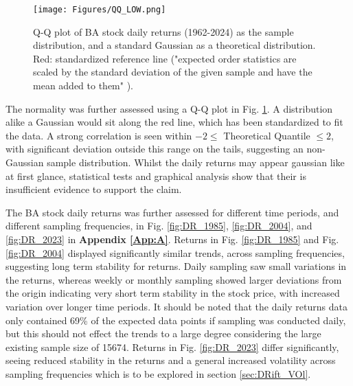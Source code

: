 \documentclass[
	a4paper, %
	11pt, %
	twoside, %
]{LTJournalArticle}
\begin{document}
\begin{figure}[ht]
	\texttt{[image: Figures/QQ\_LOW.png]}
	\caption{Q-Q plot of BA stock daily returns (1962-2024) as the sample distribution, and a standard Gaussian as a theoretical distribution. Red: standardized reference line ("expected order statistics are scaled by the standard deviation of the given sample and have the mean added to them" \cite{statsmodels_py}).}
	\label{fig:QQ}
\end{figure}

The normality was further assessed using a Q-Q plot in Fig. \ref{fig:QQ}.
A distribution alike a Gaussian would sit along the red line, which has been standardized to fit the data.
A strong correlation is seen within $-2\leq$ Theoretical Quantile $\leq 2$, with significant deviation outside this range on the tails, suggesting an non-Gaussian sample distribution.
Whilst the daily returns may appear gaussian like at first glance, statistical tests and graphical analysis show that their is insufficient evidence to support the claim.

\indent The BA stock daily returns was further assessed for different time periods, and different sampling frequencies, in Fig. \ref{fig:DR_1985}, \ref{fig:DR_2004}, and \ref{fig:DR_2023} in \textbf{Appendix \ref*{App:A}}.
Returns in Fig. \ref{fig:DR_1985} and Fig. \ref{fig:DR_2004} displayed significantly similar trends, across sampling frequencies, suggesting long term stability for returns.
Daily sampling saw small variations in the returns, whereas weekly or monthly sampling showed larger deviations from the origin indicating very short term stability in the stock price, with increased variation over longer time periods.
It should be noted that the daily returns data only contained 69\% of the expected data points if sampling was conducted daily, but this should not effect the trends to a large degree considering the large existing sample size of 15674.
Returns in Fig. \ref{fig:DR_2023} differ significantly, seeing reduced stability in the returns and a general increased volatility across sampling frequencies which is to be explored in section \ref{sec:DRift_VOl}.
\end{document}
